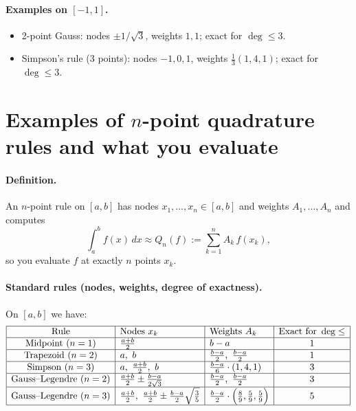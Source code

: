 \documentclass[11pt,a4paper]{article}
\theoremstyle{definition}
\theoremstyle{definition}
\theoremstyle{plain}
\theoremstyle{remark}
\begin{document}
\paragraph{Examples on \([-1,1]\).}
\begin{itemize}
	\item 2-point Gauss: nodes \(\pm 1/\sqrt{3}\), weights \(1,1\); exact for \(\deg\le 3\).
	\item Simpson’s rule (3 points): nodes \(-1,0,1\), weights \(\tfrac{1}{3}(1,4,1)\); exact for \(\deg\le 3\).
\end{itemize}

\section*{Examples of \(n\)-point quadrature rules and what you evaluate}

\paragraph{Definition.}
An \(n\)-point rule on \([a,b]\) has nodes \(x_1,\dots,x_n\in[a,b]\) and weights
\(A_1,\dots,A_n\) and computes
\[
\int_a^b f(x)\,dx \approx Q_n(f):=\sum_{k=1}^n A_k\,f(x_k),
\]
so you evaluate \(f\) at exactly \(n\) points \(x_k\).

\paragraph{Standard rules (nodes, weights, degree of exactness).}
On \([a,b]\) we have:
\[
\begin{array}{|c|l|l|c|}
	\hline
	\text{Rule} & \text{Nodes } x_k & \text{Weights } A_k & \text{Exact for }\deg\le \\
	\hline
	\text{Midpoint }(n=1) & \frac{a+b}{2} &
	b-a & 1\\
	\hline
	\text{Trapezoid }(n=2) & a,\ b &
	\frac{b-a}{2},\ \frac{b-a}{2} & 1\\
	\hline
	\text{Simpson }(n=3) & a,\ \frac{a+b}{2},\ b &
	\frac{b-a}{6}\cdot(1,4,1) & 3\\
	\hline
	\text{Gauss--Legendre }(n=2) &
	\frac{a+b}{2}\pm \frac{b-a}{2\sqrt{3}} &
	\frac{b-a}{2},\ \frac{b-a}{2} & 3\\
	\hline
	\text{Gauss--Legendre }(n=3) &
	\frac{a+b}{2},\ \frac{a+b}{2}\pm \frac{b-a}{2}\sqrt{\frac{3}{5}} &
	\frac{b-a}{2}\cdot\Big(\frac{8}{9},\frac{5}{9},\frac{5}{9}\Big) & 5\\
	\hline
\end{array}
\]
\end{document}
